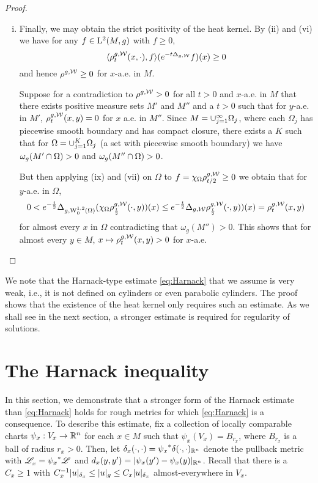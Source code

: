 \documentclass[a4paper, 12pt]{amsart}
\begin{document}
\begin{proof}
\begin{enumerate}[(i)]
      \item Finally, we may obtain the strict positivity of the heat kernel. By (ii) and (vi) we have for any $f \in \Lp{2}(M, g)$ with $f \geq 0$,
        $$\inprod{\hk^{g,\cW}_t(x,\cdot), f} (e^{-t \Delta_{g,\cW}}f) (x) \geq 0$$
        and hence $\hk^{g,\cW} \geq 0$ for $x$-a.e. in $M$.

        Suppose for a contradiction to $\hk^{g,\cW} > 0$ for all $t > 0$ and $x$-a.e. in $M$ that there exists positive measure sets $M'$ and $M''$ and a $t > 0$ such that for $y$-a.e. in $M'$, $\hk^{g,\cW}_t(x,y) = 0$ for $x$ a.e. in $M''$.
	Since $M = \union_{j=1}^\infty \Omega_j$, where each $\Omega_j$ has piecewise smooth boundary and has compact closure, 
	there exists a $K$ such that for $\Omega = \union_{j=1}^K \Omega_j$ (a set with piecewise smooth boundary) we have $\omega_g(M' \intersect \Omega) > 0$ and $\omega_g(M'' \intersect \Omega) > 0$.
        
	But then applying (ix) and (vii) on $\Omega$ to $f = \chi_{\Omega} \hk^{g,\cW}_{t/2} \geq 0$ we obtain that for $y$-a.e. in $\Omega$,
	$$0 < e^{-\frac{t}{2}} \Delta_{g,\SobH[0]{1}(\Omega)}(\chi_{\Omega} \hk^{g,\cW}_{\frac{t}{2}}(\cdot,y))(x) \leq e^{-\frac{t}{2}} \Delta_{g,\cW}\hk^{g,\cW}_{\frac{t}{2}}(\cdot,y))(x)  = \hk^{g,\cW}_{t}(x,y)$$
	for almost every $x$ in $\Omega$ contradicting that $\omega_g(M'') > 0$.
        This shows that for almost every $y \in M$, $x \mapsto \hk^{g,\cW}_t(x,y) > 0$ for $x$-a.e.
	\qedhere
\end{enumerate} 
\end{proof}

\begin{rem}
We note that the Harnack-type estimate \eqref{eq:Harnack} that we assume is very 
weak, i.e., it is not defined on cylinders or even 
parabolic cylinders. The proof shows that the existence 
of the heat kernel only requires such an estimate. 
As we shall see in the next section, a stronger
estimate is required for regularity of solutions. 
\end{rem}

\section{The Harnack inequality}
\label{sec:harnack}

In this section, we demonstrate that a
stronger form of the  Harnack 
estimate than \eqref{eq:Harnack} holds for rough 
metrics for which  \eqref{eq:Harnack} is a consequence.
To describe this estimate, fix a collection of 
locally comparable charts $\psi_x:V_x \to \R^n$ 
for each $x \in M$ such that $\psi_x(V_x) = B_{r_x}$,
where $B_{r_x}$ is a ball of radius $r_x > 0$. 
Then, let
$\delta_x(\cdot, \cdot) = \pullb{\psi_x}\delta(\cdot, \cdot)_{\R^n}$
denote the pullback metric with $\Leb_x = \pullb{\psi_x}\Leb$
and $d_x(y,y') = \modulus{\psi_x(y') - \psi_x(y)}_{\R^n}$.
Recall that there is a $C_x \geq 1$
with $C_x^{-1}  \modulus{u}_{\delta_x} \leq \modulus{u}_g \leq C_x \modulus{u}_{\delta_x}$
almost-everywhere in $V_x$.
\end{document}
